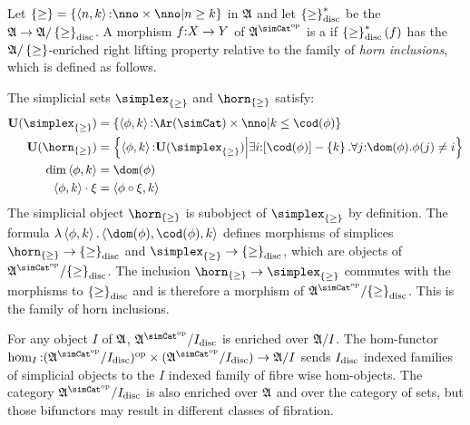 \documentclass[csh.tex]{subfiles}
\begin{document}
\begin{definition}
Let $\set\geq = \set{\tuplet{n,k}\of \nno\times\nno |n\geq k}$ in
 $\mathfrak A$ and let $\left\{\geq\right\}_{\rm disc}^*$ be the 
  $\mathfrak A\to\mathfrak A/\left\{\geq\right\}_{\rm disc}$.
A morphism $f\mathord : X\to Y$ of $\ambient\s$ is a  if 
$\left\{\geq\right\}_{\rm disc}^*(f)$ has the $\mathfrak A/\left\{\geq\right\}$-enriched right lifting 
property relative to the family of \emph{horn inclusions}, which is defined as 
follows.

The simplicial sets $\simplex_{\set\geq}$ and $\horn_{\set\geq}$ satisfy:
\begin{align*}
\base(\simplex_{\set\geq}) &= \set{\tuplet{\phi,k}\of\Ar(\simCat)\times\nno\middle| k\leq \cod(\phi) } \\
\base(\horn_{\set\geq}) &= \set{\tuplet{\phi,k}\of\base(\simplex_{\set\geq})\middle| 
\exists i\of[\cod(\phi)]-\set k.\forall j\of \dom(\phi).\phi(j)\neq i} \\
\dim\tuplet{\phi,k} &= \dom(\phi) \\
\tuplet{\phi,k}\cdot \xi &= \tuplet{\phi\circ\xi,k}
\end{align*}
The simplicial object $\horn_{\set\geq}$ is subobject of $\simplex_{\set\geq}$ 
by definition. The formula $\function{\tuplet{\phi,k}}\tuplet{\dom(\phi),\cod(\phi),k}$ 
defines morphisms of simplices $\horn_{\set\geq}\to {\set\geq}\disc$ and 
$\simplex_{\set\geq}\to {\set\geq}\disc$, which are objects of 
$\ambient\s/{\set\geq}\disc$. The inclusion $\horn_{\set\geq}\to\simplex_{\set\geq}$ 
commutes with the morphisms to ${\left\{\geq\right\}}_{\rm disc}$ and is therefore a morphism of 
$\ambient\s/{\set\geq}\disc$. This is the family of horn inclusions.
\end{definition}

\begin{remark}\label{fibred enrichment}
For any object $I$ of $\mathfrak A$, $\ambient\s/I\disc$ is enriched over
 $\mathfrak A/I$. The hom-functor 
 $\hom_I\of(\ambient\s/I\disc)\dual\times(\ambient\s/I\disc)\to\ambient/I$ 
 sends $I_{\rm disc}$ indexed families of simplicial objects to the $I$ indexed 
 family of fibre wise hom-objects. The category $\ambient\s/I\disc$ is also 
 enriched over $\mathfrak A$ and over the category of sets, but those bifunctors 
 may result in different classes of fibration. 
\end{remark}
\end{document}
